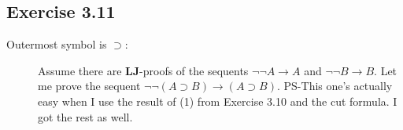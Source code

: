 \documentclass{article}
\def\fCenter{\mbox{$\rightarrow$}}
\begin{document}
\subsection{Exercise 3.11}
    \begin{description}
        \item[Outermost symbol is \(\supset\):]
        Assume there are \textbf{LJ}-proofs of the sequents \(\neg\neg A \rightarrow A\)
        and \(\neg \neg B \rightarrow B\).
        Let me prove the sequent \(\neg \neg (A \supset B) \rightarrow (A \supset B)\).
        PS-This one's actually easy when I use the result of (1) from Exercise 3.10 and the cut formula.
        I got the rest as well.
    \end{description}
\end{document}
